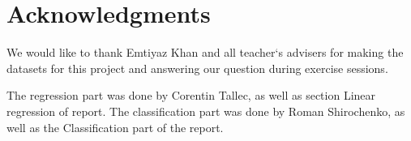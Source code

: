 \documentclass{article} %
\begin{document}
\section{Acknowledgments}
We would like to thank Emtiyaz Khan and all teacher`s advisers for making the datasets for this project and answering our question during exercise sessions.

The regression part was done by Corentin Tallec, as well as section Linear regression of report. The classification part was done by Roman Shirochenko, as well as the Classification part of the report.
\end{document}
